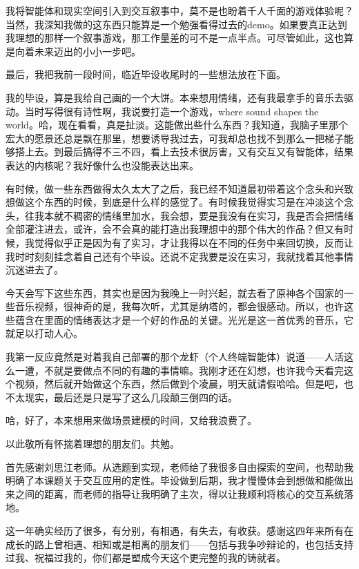 \documentclass[bachelor]{njupthesis}
\begin{document}
我将智能体和现实空间引入到交互叙事中，莫不是也盼着千人千面的游戏体验呢？当然，我深知我做的这东西只能算是一个勉强看得过去的demo。如果要真正达到我理想的那样一个叙事游戏，那工作量差的可不是一点半点。可尽管如此，这也算是向着未来迈出的小小一步吧。

最后，我把我前一段时间，临近毕设收尾时的一些想法放在下面。

我的毕设，算是我给自己画的一个大饼。本来想用情绪，还有我最拿手的音乐去驱动。当时写得很有诗性啊，我说要打造一个游戏，where sound shapes the world。哈，现在看看，真是扯淡。这能做出些什么东西？我知道，我脑子里那个宏大的愿景还总是飘在那里，想要诱导我过去，可我却总也找不到那么一把梯子能够搭上去。到最后搞得不三不四，看上去技术很厉害，又有交互又有智能体，结果表达的内核呢？我好像什么也没能表达出来。

有时候，做一些东西做得太久太大了之后，我已经不知道最初带着这个念头和兴致想做这个东西的时候，到底是什么样的感觉了。有时候我觉得实习是在冲淡这个念头，往我本就不稠密的情绪里加水，我会想，要是我没有在实习，我是否会把情绪全部灌注进去，或许，会不会真的能打造出我理想中的那个伟大的作品？但又有时候，我觉得似乎正是因为有了实习，才让我得以在不同的任务中来回切换，反而让我时时刻刻挂念着自己还有个毕设。还说不定我要是没在实习，我就找着其他事情沉迷进去了。

今天会写下这些东西，其实也是因为我晚上一时兴起，就去看了原神各个国家的一些音乐视频，很神奇的是，我每次听，尤其是纳塔的，都会很感动。所以，也许这些蕴含在里面的情绪表达才是一个好的作品的关键。光光是这一首优秀的音乐，它就足以打动人心。

我第一反应竟然是对着我自己部署的那个龙虾（个人终端智能体）说道——人活这么一遭，不就是要做点不同的有趣的事情嘛。我刚才还在幻想，也许我今天看完这个视频，然后就开始做这个东西，然后做到个凌晨，明天就请假哈哈。但是吧，也不太现实，最后还是只是写了这么几段颠三倒四的话。

哈，好了，本来想用来做场景建模的时间，又给我浪费了。

以此敬所有怀揣着理想的朋友们。共勉。

\thesisacknowledgement

首先感谢刘思江老师。从选题到实现，老师给了我很多自由探索的空间，也帮助我明确了本课题关于交互应用的定性。毕设做到后期，我才慢慢体会到想做和能做出来之间的距离，而老师的指导让我明确了主次，得以让我顺利将核心的交互系统落地。

这一年确实经历了很多，有分别，有相遇，有失去，有收获。感谢这四年来所有在成长的路上曾相遇、相知或是相离的朋友们——包括与我争吵辩论的，也包括支持过我、祝福过我的，你们都是塑成今天这个更完整的我的铸就者。
\end{document}
